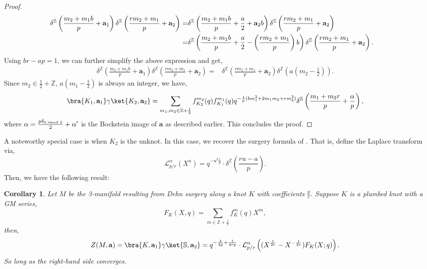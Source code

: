 \documentclass{article}
\newcommand{\Z}{{\mathbb Z}}
\newtheorem{corollary}{Corollary}
\numberwithin{corollary}{theorem}
\numberwithin{corollary}{proposition}
\begin{document}
\begin{proof}
\begin{align*}
   \delta^\Z\left(\frac{m_2+m_1b}{p}+ \mathbf{a}_{1} \right) \delta^\Z\left(\frac{r m_2+m_1}{p}+\mathbf{a}_2\right) = & \delta^\Z\left(\frac{m_2 + m_1 b }{p}+\frac{a}{2} + \mathbf{a}_{2} b \right)\delta^\Z\left(\frac{r m_2 + m_1}{p} +\mathbf{a}_{2} \right) \endline
   = & \delta^\Z\left(\frac{m_2 + m_1 b }{p}+\frac{a}{2} -\left( \frac{r m_2 + m_1}{p}  \right) b \right)\delta^\Z\left(\frac{r m_2 + m_1}{p} +\mathbf{a}_{2} \right).
\end{align*}
Using $b r - a p =1 $, we can further simplify the above expression and get,
\begin{align*}
   \delta^\Z\left(\frac{m_2 + m_1 b}{p}+\mathbf{a}_1\right) \delta^\Z\left(\frac{r m_2+m_1}{p}+\mathbf{a}_2\right)  = & \delta^\Z\left(\frac{r m_2 + m_1}{p} +\mathbf{a}_{2} \right)\delta^\Z\left( a (m_{2}- \frac{1}{2}) \right) .
\end{align*}
Since $m_{2} \in \frac{1}{2} + \Z$, $ a (m_{1}- \frac{1}{2})$ is always an integer, we have, 
\begin{align*}
    \bra{K_1,\mathbf{a}_1}\gamma \ket{K_2,\mathbf{a}_2} = \sum_{m_1,m_2\in \Z+\frac{1}{2}}f^{m_2}_{K_2}(q)f^{m_1}_{K_1}(q) q^{-\frac{1}{p}(b m_{1}^{2}+2 m_{1} m_{2}+ r m_{2}^{2})}  \delta^\Z\left(\frac{m_{1}+m_{2} r}{p}+ \frac{\alpha}{p}  \right),
\end{align*}
where $\alpha = \frac{p \delta_{0, r \hspace{-0.2cm} \mod 2}}{2} +\alpha^{\prime} $ is the Bockstein image of $\mathbf{a}$ as described earlier. This concludes the proof.
\end{proof}

A noteworthy special case is when $K_2$ is the unknot. In this case, we recover the surgery formula of \cite{GM}. That is, define the Laplace transform via, 
$$\mathcal{L}^\alpha_{p/r}(X^u) = q^{-u^2\frac{r}{p}}\cdot \delta^\Z(\frac{ru-a}{p}).$$
Then, we have the following result: 
\begin{corollary}
    Let $M$ be the 3-manifold resulting from Dehn surgery along a knot $K$ with coefficients $\frac{p}{r}$. Suppose $K$ is a plumbed knot with a GM series, 
    $$F_K(X,q) = \sum_{m\in \Z+\frac{1}{2}}f^m_K(q) X^m,$$
    then,
    $$Z(M,\mathbf{a}) = \bra{K,\mathbf{a}_1}\gamma\ket{\mathbb{S},\mathbf{a}_2} = q^{-\frac{b}{4p}+\frac{1}{4rp}}\cdot \mathcal{L}^\alpha_{p/r}\left((X^{\frac{1}{2r}}-X^{-\frac{1}{2r}})F_K(X;q)\right).$$
    So long as the right-hand side converges. 
\end{corollary}
\end{document}
